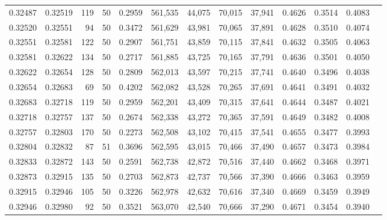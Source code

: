 \begin{tabular}{rrrrrrrrrrrrr}
0.32487 & 0.32519 &   119 &  50 &                                     0.2959 & 561,535 &  44,075 &  70,015 &  37,941 & 0.4626 & 0.3514 & 0.4083 \\
0.32520 & 0.32551 &    94 &  50 &                                     0.3472 & 561,629 &  43,981 &  70,065 &  37,891 & 0.4628 & 0.3510 & 0.4074 \\
0.32551 & 0.32581 &   122 &  50 &                                     0.2907 & 561,751 &  43,859 &  70,115 &  37,841 & 0.4632 & 0.3505 & 0.4063 \\
0.32581 & 0.32622 &   134 &  50 &                                     0.2717 & 561,885 &  43,725 &  70,165 &  37,791 & 0.4636 & 0.3501 & 0.4050 \\
0.32622 & 0.32654 &   128 &  50 &                                     0.2809 & 562,013 &  43,597 &  70,215 &  37,741 & 0.4640 & 0.3496 & 0.4038 \\
0.32654 & 0.32683 &    69 &  50 &                                     0.4202 & 562,082 &  43,528 &  70,265 &  37,691 & 0.4641 & 0.3491 & 0.4032 \\
0.32683 & 0.32718 &   119 &  50 &                                     0.2959 & 562,201 &  43,409 &  70,315 &  37,641 & 0.4644 & 0.3487 & 0.4021 \\
0.32718 & 0.32757 &   137 &  50 &                                     0.2674 & 562,338 &  43,272 &  70,365 &  37,591 & 0.4649 & 0.3482 & 0.4008 \\
0.32757 & 0.32803 &   170 &  50 &                                     0.2273 & 562,508 &  43,102 &  70,415 &  37,541 & 0.4655 & 0.3477 & 0.3993 \\
0.32804 & 0.32832 &    87 &  51 &                                     0.3696 & 562,595 &  43,015 &  70,466 &  37,490 & 0.4657 & 0.3473 & 0.3984 \\
0.32833 & 0.32872 &   143 &  50 &                                     0.2591 & 562,738 &  42,872 &  70,516 &  37,440 & 0.4662 & 0.3468 & 0.3971 \\
0.32873 & 0.32915 &   135 &  50 &                                     0.2703 & 562,873 &  42,737 &  70,566 &  37,390 & 0.4666 & 0.3463 & 0.3959 \\
0.32915 & 0.32946 &   105 &  50 &                                     0.3226 & 562,978 &  42,632 &  70,616 &  37,340 & 0.4669 & 0.3459 & 0.3949 \\
0.32946 & 0.32980 &    92 &  50 &                                     0.3521 & 563,070 &  42,540 &  70,666 &  37,290 & 0.4671 & 0.3454 & 0.3940 \\

\end{tabular}
